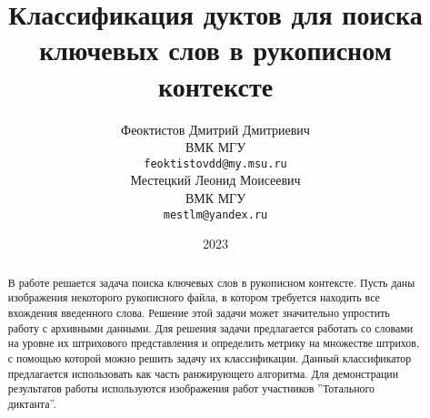 \documentclass{article}
\title{Классификация дуктов для поиска ключевых слов в рукописном контексте}
\author{ Феоктистов Дмитрий Дмитриевич \\
	ВМК МГУ\\
	\texttt{feoktistovdd@my.msu.ru} \\
	\And
	Местецкий Леонид Моисеевич \\
	ВМК МГУ\\
	\texttt{mestlm@yandex.ru} \\
}
\date{2023}
\begin{document}
\maketitle
\begin{abstract}
	В работе решается задача поиска ключевых слов в рукописном контексте. Пусть даны изображения некоторого рукописного файла, в котором требуется находить все вхождения введенного слова. Решение этой задачи может значительно упростить работу с архивными данными. Для решения задачи предлагается работать со словами на уровне их штрихового представления и определить метрику на множестве штрихов, с помощью которой можно решить задачу их классификации. Данный классификатор предлагается использовать как часть ранжирующего алгоритма. Для демонстрации результатов работы используются изображения работ участников ''Тотального диктанта''.
\end{abstract}


\end{document}
